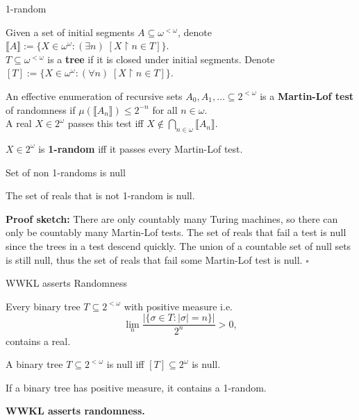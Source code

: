 \begin{frame}{1-random}
  \begin{notation*}
    Given a set of initial segments $A\subseteq\omega^{<\omega}$, denote
    $\llbracket A\rrbracket:= \{X\in\omega^\omega: (\exists n)\;
    [X\restriction n \in T]\}$.\\
    \vspace{0.5em}
    $T\subseteq\omega^{<\omega}$ is a \textbf{tree} if it is closed under
    initial segments. Denote $[T]:= \{X\in\omega^\omega: (\forall n)\;
    [X\restriction n \in T]\}$.
  \end{notation*}

  \begin{define*}
    An effective enumeration of recursive sets
    $A_0,A_1,\ldots \subseteq 2^{<\omega}$ is a \textbf{Martin-Lof test} of
    randomness if $\mu(\llbracket A_n\rrbracket) \leq 2^{-n}$ for all
    $n\in\omega$.\\
    \vspace{0.5em}
    A real $X\in2^\omega$ passes this test iff $X\not\in
    \bigcap_{n\in\omega} \llbracket A_n\rrbracket$.
  \end{define*}

  \begin{define*}
    $X\in2^\omega$ is \textbf{1-random} iff it passes every Martin-Lof
    test.
  \end{define*}
\end{frame}

\begin{frame}{Set of non 1-randoms is null}
  \begin{fact*}
    The set of reals that is not 1-random is null.
  \end{fact*}

  \vspace{2em}
  \textbf{Proof sketch:} There are only countably many Turing machines, so
  there can only be countably many Martin-Lof tests. The set of reals that
  fail a test is null since the trees in a test descend quickly. The union
  of a countable set of null sets is still null, thus the set of reals that
  fail some Martin-Lof test is null. $\square$
\end{frame}

\begin{frame}{WWKL asserts Randomness}
  \begin{thm*}
    Every binary tree $T\subseteq 2^{<\omega}$ with positive measure i.e.
    \[\lim_n \frac{|\{\sigma\in T: |\sigma|=n\}|}{2^n} >0,\]
    contains a real.
  \end{thm*}
  \begin{fact}
    A binary tree $T\subseteq2^{<\omega}$ is null iff
    $[T]\subseteq2^\omega$ is null.
  \end{fact}
  \begin{coro}
    If a binary tree has positive measure, it contains a 1-random.
  \end{coro}

  \textbf{WWKL asserts randomness.}
\end{frame}


